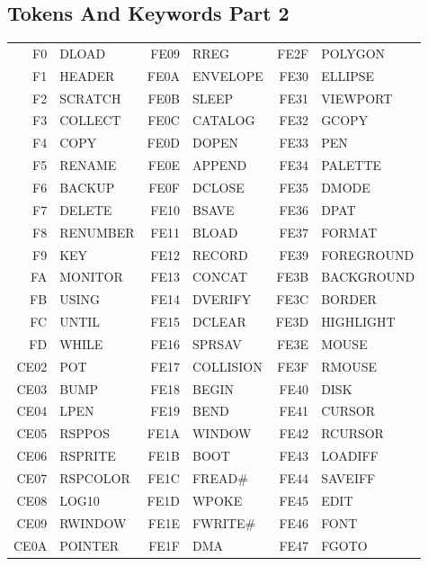 \subsection{Tokens And Keywords Part 2}
{\ttfamily
\setlength{\tabcolsep}{1mm}
\begin{center}
\begin{tabular}{|rp{2.2cm}|rp{2.2cm}|rp{2.2cm}|}
\hline
  F0 & DLOAD      &FE09 & RREG       &FE2F & POLYGON    \\
  F1 & HEADER     &FE0A & ENVELOPE   &FE30 & ELLIPSE    \\
  F2 & SCRATCH    &FE0B & SLEEP      &FE31 & VIEWPORT   \\
  F3 & COLLECT    &FE0C & CATALOG    &FE32 & GCOPY      \\
  F4 & COPY       &FE0D & DOPEN      &FE33 & PEN        \\
  F5 & RENAME     &FE0E & APPEND     &FE34 & PALETTE    \\
  F6 & BACKUP     &FE0F & DCLOSE     &FE35 & DMODE      \\
  F7 & DELETE     &FE10 & BSAVE      &FE36 & DPAT       \\
  F8 & RENUMBER   &FE11 & BLOAD      &FE37 & FORMAT     \\
  F9 & KEY        &FE12 & RECORD     &FE39 & FOREGROUND \\
  FA & MONITOR    &FE13 & CONCAT     &FE3B & BACKGROUND \\
  FB & USING      &FE14 & DVERIFY    &FE3C & BORDER     \\
  FC & UNTIL      &FE15 & DCLEAR     &FE3D & HIGHLIGHT  \\
  FD & WHILE      &FE16 & SPRSAV     &FE3E & MOUSE      \\
CE02 & POT        &FE17 & COLLISION  &FE3F & RMOUSE     \\
CE03 & BUMP       &FE18 & BEGIN      &FE40 & DISK       \\
CE04 & LPEN       &FE19 & BEND       &FE41 & CURSOR     \\
CE05 & RSPPOS     &FE1A & WINDOW     &FE42 & RCURSOR    \\
CE06 & RSPRITE    &FE1B & BOOT       &FE43 & LOADIFF    \\
CE07 & RSPCOLOR   &FE1C & FREAD\#    &FE44 & SAVEIFF    \\
CE08 & LOG10      &FE1D & WPOKE      &FE45 & EDIT       \\
CE09 & RWINDOW    &FE1E & FWRITE\#   &FE46 & FONT       \\
CE0A & POINTER    &FE1F & DMA        &FE47 & FGOTO      \\

\end{tabular}
\end{center}}
